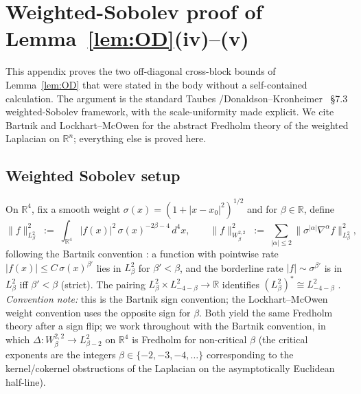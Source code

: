 \documentclass[11pt,letterpaper]{article}
\theoremstyle{definition}
\newcommand{\bbR}{\mathbb{R}}
\newcommand{\Lap}{\Delta}
\begin{document}
\section{Weighted-Sobolev proof of Lemma~\ref{lem:OD}(iv)--(v)}\label{app:weighted-sobolev}

This appendix proves the two off-diagonal cross-block bounds of Lemma~\ref{lem:OD} that were stated in the body without a self-contained calculation. The argument is the standard Taubes \cite{Taubes1988}/Donaldson--Kronheimer \cite{DK1990}~\S 7.3 weighted-Sobolev framework, with the scale-uniformity made explicit. We cite Bartnik \cite{Bartnik1986} and Lockhart--McOwen \cite{LMcO1985} for the abstract Fredholm theory of the weighted Laplacian on $\bbR^n$; everything else is proved here.

\subsection{Weighted Sobolev setup}\label{app:sec:setup}

On $\bbR^4$, fix a smooth weight $\sigma(x) = (1+|x-x_0|^2)^{1/2}$ and for $\beta \in \bbR$, define
\[
\|f\|_{L^2_\beta}^2 \;:=\; \int_{\bbR^4} |f(x)|^2\,\sigma(x)^{-2\beta - 4}\,d^4x,
\qquad
\|f\|_{W^{2,2}_\beta}^2 \;:=\; \sum_{|\alpha|\le 2}\|\sigma^{|\alpha|}\nabla^\alpha f\|_{L^2_\beta}^2 ,
\]
following the Bartnik convention \cite{Bartnik1986}: a function with pointwise rate $|f(x)| \le C\,\sigma(x)^{\beta'}$ lies in $L^2_\beta$ for $\beta' < \beta$, and the borderline rate $|f|\sim \sigma^{\beta'}$ is in $L^2_\beta$ iff $\beta' < \beta$ (strict). The pairing $L^2_\beta \times L^2_{-4-\beta} \to \bbR$ identifies $(L^2_\beta)^* \cong L^2_{-4-\beta}$ \cite{Bartnik1986}. \emph{Convention note:} this is the Bartnik sign convention; the Lockhart--McOwen weight convention \cite{LMcO1985} uses the opposite sign for $\beta$. Both yield the same Fredholm theory after a sign flip; we work throughout with the Bartnik convention, in which $\Lap: W^{2,2}_\beta \to L^2_{\beta - 2}$ on $\bbR^4$ is Fredholm for non-critical $\beta$ (the critical exponents are the integers $\beta \in \{-2, -3, -4, \dots\}$ corresponding to the kernel/cokernel obstructions of the Laplacian on the asymptotically Euclidean half-line).
\end{document}
